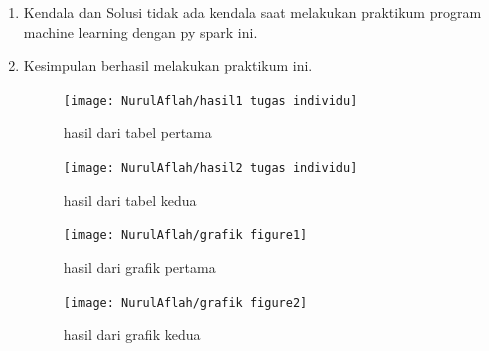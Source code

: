 \begin{enumerate}
\item Kendala dan Solusi
\newline tidak ada kendala saat melakukan praktikum program machine learning dengan py spark ini.

\item Kesimpulan
\newline berhasil melakukan praktikum ini.
\newpage
\begin{figure} [!ht]
\texttt{[image: NurulAflah/hasil1 tugas individu]}
\caption{hasil dari tabel pertama}
\label{gam:hasil1 tugas individu}
\end{figure}

\begin{figure} [!ht]
\texttt{[image: NurulAflah/hasil2 tugas individu]}
\caption{hasil dari tabel kedua}
\label{gam:hasil2 tugas individu}
\end{figure}
\newpage
\begin{figure} [!ht]
\texttt{[image: NurulAflah/grafik figure1]}
\caption{hasil dari grafik pertama}
\label{gam:grafik figure1}
\end{figure}

\begin{figure} [!ht]
\texttt{[image: NurulAflah/grafik figure2]}
\caption{hasil dari grafik kedua}
\label{gam:grafik figure2}
\end{figure}
\end{enumerate}

